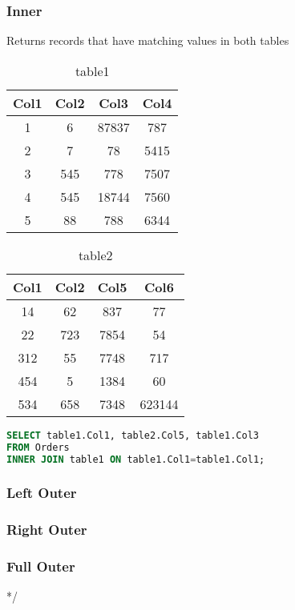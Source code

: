 \documentclass{article}
\begin{document}
\subsubsection*{Inner}
Returns records that have matching values in both tables
\begin{table}
\begin{center}
 \begin{tabular}{|c c c c|} 
 \hline
 Col1 & Col2 & Col3 & Col4 \\ [0.5ex] 
 \hline\hline
 1 & 6 & 87837 & 787 \\ 
 \hline
 2 & 7 & 78 & 5415 \\
 \hline
 3 & 545 & 778 & 7507 \\
 \hline
 4 & 545 & 18744 & 7560 \\
 \hline
 5 & 88 & 788 & 6344 \\ [1ex] 
 \hline
 
\end{tabular}
\end{center}
\caption{table1}
\end{table}
\begin{table}
\begin{center}
\begin{tabular}{|c c c c|} 
 \hline
 Col1 & Col2 & Col5 & Col6 \\ [0.5ex] 
 \hline\hline
 14 & 62 & 837 & 77 \\ 
 \hline
 22 & 723 & 7854 & 54 \\
 \hline
 312 & 55 & 7748 & 717 \\
 \hline
 454 & 5 & 1384 & 60 \\
 \hline
 534 & 658 & 7348 & 623144 \\ [1ex] 
 \hline
 
\end{tabular}
\end{center}
\caption{table2}
\end{table}
\begin{lstlisting}[language=SQL]
SELECT table1.Col1, table2.Col5, table1.Col3 
FROM Orders 
INNER JOIN table1 ON table1.Col1=table1.Col1;
\end{lstlisting}
\subsubsection*{Left Outer}
\subsubsection*{Right Outer}
\subsubsection*{Full Outer}
*/
\end{document}
